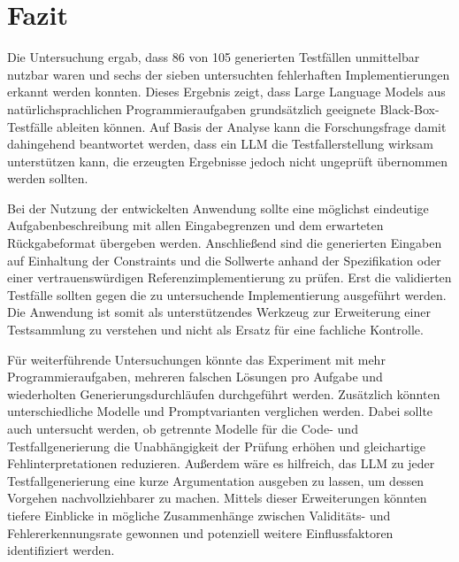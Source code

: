 \section{Fazit}
Die Untersuchung ergab, dass 86 von 105 generierten Testfällen unmittelbar nutzbar waren und 
sechs der sieben untersuchten fehlerhaften Implementierungen erkannt werden konnten.
Dieses Ergebnis zeigt, dass Large Language Models aus natürlichsprachlichen
Programmieraufgaben grundsätzlich geeignete Black-Box-Testfälle ableiten können. 
Auf Basis der Analyse kann die Forschungsfrage damit dahingehend beantwortet werden, 
dass ein \ac{LLM} die Testfallerstellung wirksam unterstützen kann, die erzeugten Ergebnisse 
jedoch nicht ungeprüft übernommen werden sollten.

Bei der Nutzung der entwickelten Anwendung sollte eine möglichst eindeutige
Aufgabenbeschreibung mit allen Eingabegrenzen und dem erwarteten Rückgabeformat übergeben
werden. Anschließend sind die generierten Eingaben auf Einhaltung der Constraints und die
Sollwerte anhand der Spezifikation oder einer vertrauenswürdigen Referenzimplementierung zu
prüfen. Erst die validierten Testfälle sollten gegen die zu untersuchende Implementierung
ausgeführt werden. Die Anwendung ist somit als unterstützendes Werkzeug zur Erweiterung einer
Testsammlung zu verstehen und nicht als Ersatz für eine fachliche Kontrolle.

Für weiterführende Untersuchungen könnte das Experiment mit mehr Programmieraufgaben, mehreren
falschen Lösungen pro Aufgabe und wiederholten Generierungsdurchläufen durchgeführt werden.
Zusätzlich könnten unterschiedliche Modelle und Promptvarianten verglichen werden. Dabei sollte
auch untersucht werden, ob getrennte Modelle für die Code- und Testfallgenerierung die
Unabhängigkeit der Prüfung erhöhen und gleichartige Fehlinterpretationen reduzieren. Außerdem 
wäre es hilfreich, das \ac{LLM} zu jeder Testfallgenerierung eine kurze Argumentation ausgeben zu lassen, 
um dessen Vorgehen nachvollziehbarer zu machen. Mittels dieser Erweiterungen könnten tiefere Einblicke 
in mögliche Zusammenhänge zwischen Validitäts- und Fehlererkennungsrate gewonnen und potenziell 
weitere Einflussfaktoren identifiziert werden.